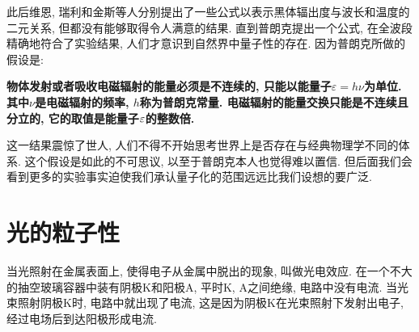 此后维恩, 瑞利和金斯等人分别提出了一些公式以表示黑体辐出度与波长和温度的二元关系, 但都没有能够取得令人满意的结果. 直到普朗克提出一个公式, 在全波段精确地符合了实验结果, 人们才意识到自然界中量子性的存在. 因为普朗克所做的假设是:
\begin{center}
  \textbf{物体发射或者吸收电磁辐射的能量必须是不连续的, 只能以能量子$\varepsilon=h \nu$为单位. 其中$\nu$是电磁辐射的频率, $h$称为普朗克常量. 电磁辐射的能量交换只能是不连续且分立的, 它的取值是能量子$\mathop{}\!\varepsilon$的整数倍. }
\end{center}
这一结果震惊了世人, 人们不得不开始思考世界上是否存在与经典物理学不同的体系. 这个假设是如此的不可思议, 以至于普朗克本人也觉得难以置信. 但后面我们会看到更多的实验事实迫使我们承认量子化的范围远远比我们设想的要广泛.

\section{光的粒子性}
当光照射在金属表面上, 使得电子从金属中脱出的现象, 叫做光电效应. 在一个不大的抽空玻璃容器中装有阴极K和阳极A, 平时K, A之间绝缘, 电路中没有电流. 当光束照射阴极K时, 电路中就出现了电流, 这是因为阴极K在光束照射下发射出电子, 经过电场后到达阳极形成电流. 

